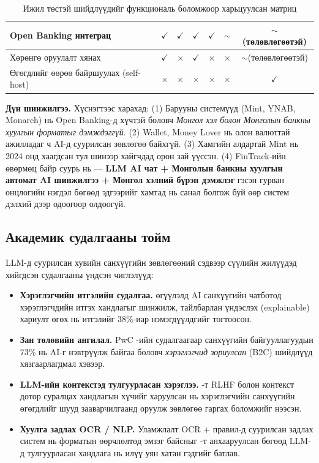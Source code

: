 \begin{table}[ht]
\begin{tabular}{|p{4.0cm}|c|c|c|c|c|c|}
Open Banking интеграц           & $\checkmark$ & $\checkmark$ & $\checkmark$ & $\checkmark$ & $\sim$        & $\sim$(төлөвлөгөөтэй) \\ \hline
Хөрөнгө оруулалт хянах          & $\checkmark$ & $\times$     & $\checkmark$ & $\times$     & $\times$      & $\sim$(төлөвлөгөөтэй) \\ \hline
Өгөгдлийг өөрөө байршуулах (self-host) & $\times$ & $\times$ & $\times$  & $\times$     & $\times$      & $\checkmark$ \\ \hline
\end{tabular}
\caption{Ижил төстэй шийдлүүдийг функциональ боломжоор харьцуулсан матриц}
\label{tab:competitors-feature}
\end{table}

\textbf{Дүн шинжилгээ.} Хүснэгтээс харахад: (1) Барууны системүүд (Mint, YNAB, Monarch) нь Open Banking-д хүчтэй боловч \emph{Монгол хэл болон Монголын банкны хуулгын форматыг дэмждэггүй}. (2) Wallet, Money Lover нь олон валюттай ажилладаг ч AI-д суурилсан зөвлөгөө байхгүй. (3) Хамгийн алдартай Mint нь 2024 онд хаагдсан тул шинээр хайгчдад орон зай үүссэн. (4) FinTrack-ийн өвөрмөц байр суурь нь --- \textbf{LLM AI чат + Монголын банкны хуулгын автомат AI шинжилгээ + Монгол хэлний бүрэн дэмжлэг} гэсэн гурван онцлогийн нэгдэл бөгөөд эдгээрийг хамтад нь санал болгож буй өөр систем дэлхий дээр одоогоор олдоогүй.

\subsection{Академик судалгааны тойм}
LLM-д суурилсан хувийн санхүүгийн зөвлөгөөний сэдвээр сүүлийн жилүүдэд хийгдсэн судалгааны үндсэн чиглэлүүд:

\begin{itemize}
    \item \textbf{Хэрэглэгчийн итгэлийн судалгаа.} \cite{chatbotfin} өгүүлэлд AI санхүүгийн чатботод хэрэглэгчдийн итгэх хандлагыг шинжилж, тайлбарлан үндэслэх (explainable) хариулт өгөх нь итгэлийг 38\%-иар нэмэгдүүлдгийг тогтоосон.
    \item \textbf{Зан төлөвийн ангилал.} PwC \cite{pwc_ai_finance}-ийн судалгаагаар санхүүгийн байгууллагуудын 73\% нь AI-г нэвтрүүлж байгаа боловч \emph{хэрэглэгчид зориулсан} (B2C) шийдлүүд хязгаарлагдмал хэвээр.
    \item \textbf{LLM-ийн контекстэд тулгуурласан хэрэглээ.} \cite{instructgpt, gpt3}-т RLHF болон контекст дотор суралцах хандлагын хүчийг харуулсан нь хэрэглэгчийн санхүүгийн өгөгдлийг шууд зааварчилгаанд оруулж зөвлөгөө гаргах боломжийг нээсэн.
    \item \textbf{Хуулга задлах OCR / NLP.} Уламжлалт OCR + правил-д суурилсан задлах систем нь форматын өөрчлөлтөд эмзэг байсныг \cite{aifinance}-т анхааруулсан бөгөөд LLM-д тулгуурласан хандлага нь илүү уян хатан гэдгийг батлав.
\end{itemize}

